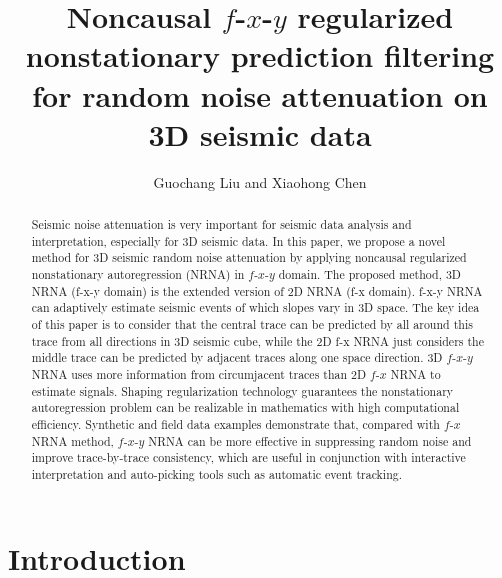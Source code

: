 \title{Noncausal $f$-$x$-$y$ regularized nonstationary prediction filtering for random noise attenuation on 3D seismic data}

\author{Guochang Liu and Xiaohong Chen}


\address{
China University of Petroleum, \\
State Key Laboratory of Petroleum Resource and Prospecting, \\
102249, Beijing, China. \\
E-mail: guochang.liu@yahoo.com; chenxh@cup.edu.cn}


\maketitle

\begin{abstract}
Seismic noise attenuation is very important for seismic data analysis and 
interpretation, especially for 3D seismic data. In this paper, we propose 
a novel method for 3D seismic random noise attenuation by applying noncausal 
regularized nonstationary autoregression (NRNA) in $f$-$x$-$y$ domain. The proposed 
method, 3D NRNA (f-x-y domain) is the extended version of 2D NRNA (f-x domain). 
f-x-y NRNA can adaptively estimate seismic events of which slopes vary in 3D space. 
The key idea of this paper is to consider that the central trace can be predicted 
by all around this trace from all directions in 3D seismic cube, while the 2D 
f-x NRNA just considers the middle trace can be predicted by adjacent traces 
along one space direction. 3D $f$-$x$-$y$ NRNA uses more information from circumjacent 
traces than 2D $f$-$x$ NRNA to estimate signals. Shaping regularization technology 
guarantees the nonstationary autoregression problem can be realizable in mathematics 
with high computational efficiency. Synthetic and field data examples demonstrate 
that, compared with $f$-$x$ NRNA method, $f$-$x$-$y$ NRNA can be more effective in suppressing 
random noise and improve trace-by-trace consistency, which are useful in conjunction 
with interactive interpretation and auto-picking tools such as automatic event tracking. 

\end{abstract}

\section{Introduction}

